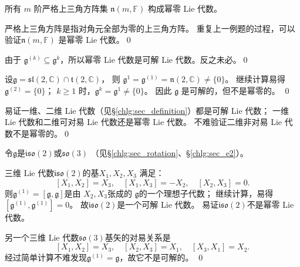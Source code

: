 \begin{example}
    所有 $m$ 阶严格上三角方阵集 $\mathfrak{n}(m, \mathbb{F})$ 构成幂零 Lie 代数。
\end{example}
严格上三角方阵是指对角元全部为零的上三角方阵。
重复上一例题的过程，可以验证$\mathfrak{n}(m, \mathbb{F})$ 是幂零 Lie 代数。\qed

\begin{example}
    由于 $\mathfrak{g}^{(k)} \subseteq \mathfrak{g}^k$，所以幂零 Lie 代数是可解 Lie 代数。反之未必。\qed   
\end{example}

\begin{example}
    设$\mathfrak{g}=\mathfrak{sl}(2, \mathbb{C}) \cap \mathfrak{t}(2, \mathbb{C})$，
    则 $\mathfrak{g}^1=\mathfrak{g}^{(1)}=\mathfrak{n}(2, \mathbb{C}) \neq\{0\}$。
    继续计算易得 $\mathfrak{g}^{(2)}=\{0\}$；
    $k \geqslant 1$ 时，$\mathfrak{g}^k=\mathfrak{g}^1 \neq\{0\}$。 
    因此 $\mathfrak{g}$ 是可解的，但不是幂零的。 \qed    
\end{example}

\begin{example}
    易证一维、二维 Lie 代数（见\S\ref{chlg:sec_definition}）都是可解 Lie 代数；
    一维 Lie 代数和二维可对易 Lie 代数还是幂零 Lie 代数。
    不难验证二维非对易 Lie 代数不是幂零的。\qed   
\end{example}


\begin{example}
    令$\mathfrak{g}$是$\mathfrak{iso}(2)$或$\mathfrak{so}(3)$
    （见\S\ref{chlg:sec_rotation}、\S\ref{chlg:sec_e2}）。
\end{example}
三维 Lie 代数$\mathfrak{iso}(2)$的基$X_1, X_2, X_3$ 满足：
\begin{equation*}
    \left[X_1, X_2\right]=X_3,\quad \left[X_1, X_3\right]=-X_2,\quad \left[X_2, X_3\right]=0.
\end{equation*}
则$\mathfrak{g}^{(1)}=[\mathfrak{g}, \mathfrak{g}]$是由 $X_2, X_3$张成的
$\mathfrak{g}$的一个理想子代数；
继续计算，易得$\left[\mathfrak{g}^{(1)}, \mathfrak{g}^{(1)}\right]=0$。
故$\mathfrak{iso}(2)$是一个可解 Lie 代数。
易证$\mathfrak{iso}(2)$不是幂零 Lie 代数。

另一个三维 Lie 代数$\mathfrak{so}(3)$基矢的对易关系是
\begin{equation*}
    \left[X_1, X_2\right]=X_3,\quad \left[X_2, X_3\right]=X_1,\quad \left[X_3, X_1\right]=X_2 .
\end{equation*}
经过简单计算不难发现$\mathfrak{g}^{(1)}=\mathfrak{g}$，故它不是可解的。 \qed


